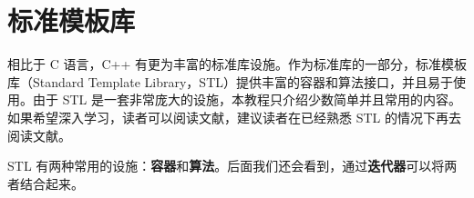 \section{标准模板库}

相比于 C 语言，C++ 有更为丰富的标准库设施。作为标准库的一部分，标准模板库（Standard Template Library，STL）提供丰富的容器和算法接口，并且易于使用。由于 STL 是一套非常庞大的设施，本教程只介绍少数简单并且常用的内容。如果希望深入学习，读者可以阅读文献\cite{Lippman2013C,StlRef2002,HouJie2002STL}，建议读者在已经熟悉 STL 的情况下再去阅读文献\cite{HouJie2002STL}。

STL 有两种常用的设施：\textbf{容器}和\textbf{算法}。后面我们还会看到，通过\textbf{迭代器}可以将两者结合起来。
